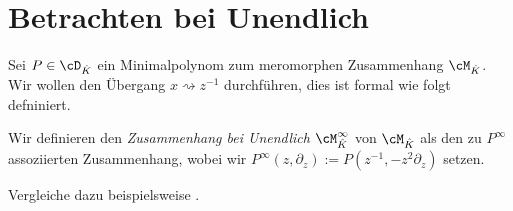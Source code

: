 \section{Betrachten bei Unendlich}
Sei $P\in\cD_{\hat K}$ ein Minimalpolynom zum meromorphen Zusammenhang
$\cM_{\hat K}$.\\
Wir wollen den Übergang $x\rightsquigarrow z^{-1}$ durchführen, dies ist formal
wie folgt defniniert.
\begin{defn}
Wir definieren den \emph{Zusammenhang bei Unendlich $\cM_{\hat K}^\infty$} von
$\cM_{\hat K}$ als den zu $P^\infty$ assoziierten Zusammenhang, wobei wir
$P^\infty(z,\partial_z):=P(z^{-1},-z^2\partial_z)$ setzen.
\end{defn}

\begin{comment}
\[
\partial_x (f(\frac{1}{x}))=
\partial_z(f)\cdot (-\frac{1}{x^2})=
-\partial_z(f)\cdot z^2= %
- z^2 \cdot \partial_z(f)
\]
also $ \partial_x\rightsquigarrow-z^2\partial_z $, und somit erhalten wir
\[
P_\phi(x,\partial_x):=\cF_Q(x^{-1},-x^2\partial_x) \in \C[t]<\partial_t> \,.
\]
\end{comment}

Vergleiche dazu beispielsweise \cite[Seite 70 Exmp. 2]{sabbah_cimpa90}.

